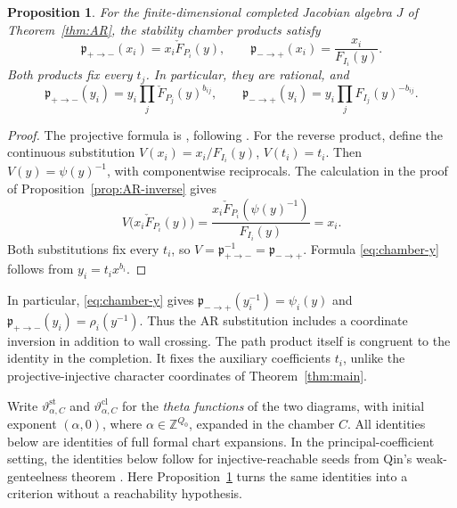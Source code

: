 \documentclass[11pt]{amsart}
\numberwithin{equation}{section}
\newtheorem{proposition}[theorem]{Proposition}
\theoremstyle{definition}
\theoremstyle{remark}
\newcommand{\ZZ}{\mathbb Z}
\begin{document}
\begin{proposition}\label{prop:chamber-products}
For the finite-dimensional completed Jacobian algebra $J$ of
Theorem~\ref{thm:AR}, the stability chamber products satisfy
\begin{equation}\label{eq:chamber-products} \mathfrak p_{+\to-}(x_i)=x_i\check F_{P_i}(y),\qquad \mathfrak p_{-\to+}(x_i)=\frac{x_i}{F_{I_i}(y)}.\end{equation}
Both products fix every $t_j$. In particular, they are rational, and
\begin{equation}\label{eq:chamber-y} \mathfrak p_{+\to-}(y_i)=y_i\prod_j\check F_{P_j}(y)^{b_{ij}},\qquad \mathfrak p_{-\to+}(y_i)=y_i\prod_jF_{I_j}(y)^{-b_{ij}}.\end{equation}
\end{proposition}

\begin{proof}
The projective formula is \cite[Lemma~2.3]{CMQ24}, following
\cite[Theorem~1.4]{Bri17}. For the reverse product, define the continuous
substitution $V(x_i)=x_i/F_{I_i}(y)$, $V(t_i)=t_i$. Then
$V(y)=\psi(y)^{-1}$, with componentwise reciprocals. The calculation
in the proof of Proposition~\ref{prop:AR-inverse} gives
\[ V\bigl(x_i\check F_{P_i}(y)\bigr)=\frac{x_i\check F_{P_i}(\psi(y)^{-1})}{F_{I_i}(y)}=x_i. \]
Both substitutions fix every $t_i$, so
$V=\mathfrak p_{+\to-}^{-1}=\mathfrak p_{-\to+}$.
Formula \eqref{eq:chamber-y} follows from $y_i=t_ix^{b_i}$.
\end{proof}

In particular, \eqref{eq:chamber-y} gives
$\mathfrak p_{-\to+}(y_i^{-1})=\psi_i(y)$ and $\mathfrak p_{+\to-}(y_i)=\rho_i(y^{-1})$.
Thus the AR substitution includes a coordinate inversion in addition
to wall crossing. The path product itself is congruent to the identity
in the completion. It fixes the auxiliary coefficients $t_i$, unlike
the projective-injective character coordinates of Theorem~\ref{thm:main}.

Write $\vartheta^{\mathrm{st}}_{\alpha,C}$ and
$\vartheta^{\mathrm{cl}}_{\alpha,C}$ for the \emph{theta functions} of
the two diagrams, with initial exponent $(\alpha,0)$, where $\alpha\in\ZZ^{Q_0}$,
expanded in the chamber $C$. All identities below are identities of
full formal chart expansions.
In the principal-coefficient setting, the identities below follow for
injective-reachable seeds from Qin's weak-genteelness theorem
\cite[Theorem~1.2.4]{Qin24}. Here Proposition~\ref{prop:chamber-products}
turns the same identities into a criterion without a reachability
hypothesis.
\end{document}
